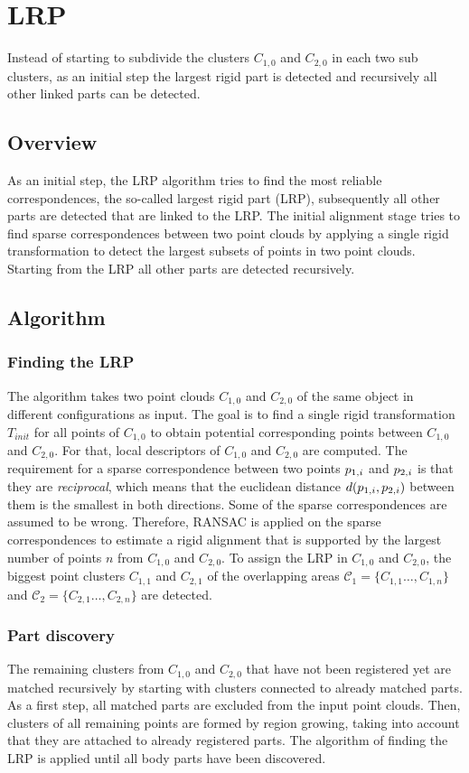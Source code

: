 \section{LRP}
\label{sec:LRP}
Instead of starting to subdivide the clusters $C_{1,0}$ and $C_{2,0}$ in each two sub clusters, as an initial step the largest rigid part is detected and recursively all other linked parts can be detected.

\subsection{Overview}
As an initial step, the LRP algorithm tries to find the most reliable correspondences, the so-called largest rigid part (LRP), subsequently all other parts are detected that are linked to the LRP. The initial alignment stage tries to find sparse correspondences between two point clouds by applying a single rigid transformation to detect the largest subsets of points in two point clouds. Starting from the LRP all other parts are detected recursively.
\subsection{Algorithm} 

\subsubsection{Finding the LRP}

The algorithm takes two point clouds $C_{1,0}$ and $C_{2,0}$ of the same object in different configurations as input.
The goal is to find a single rigid transformation $T_{init}$ for all points of $C_{1,0}$ to obtain potential corresponding points between $C_{1,0}$ and $C_{2,0}$. For that, local descriptors of $C_{1,0}$ and $C_{2,0}$ are computed. The requirement for a sparse correspondence between two points $\boldmath{p}_{1,i}$ and $\boldmath{p}_{2,i}$  is that they are \textit{reciprocal}, which means that the euclidean distance $d(\boldmath{p}_{1,i}, \boldmath{p}_{2,i})$ between them is the smallest in both directions. Some of the sparse correspondences are assumed to be wrong. Therefore, RANSAC is applied on the sparse correspondences  to estimate a rigid alignment that is supported by the largest number of points $n$ from $C_{1,0}$ and $C_{2,0}$. To assign the LRP in $C_{1,0}$ and $C_{2,0}$, the biggest point clusters $C_{1,1}$ and $C_{2,1}$ of the overlapping areas $\mathcal{C}_1 = \{C_{1,1}\ldots,C_{1,n}\}$ and  $\mathcal{C}_2 = \{C_{2,1}\ldots,C_{2,n}\}$ are detected. 


\subsubsection{Part discovery}

The remaining clusters from $C_{1,0}$ and $C_{2,0}$ that have not been registered yet are matched recursively by starting with clusters connected to already matched parts. As a first step, all matched parts are excluded from the input point clouds. Then, clusters of all remaining points are formed by region growing, taking into account that they are attached to already registered parts. The algorithm of finding the LRP is applied until all body parts have been discovered.